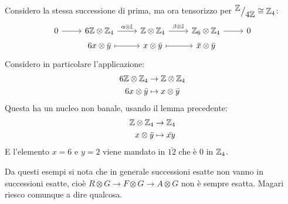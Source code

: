 \begin{example}
  Considero la stessa successione di prima, ma ora tensorizzo per $ {^{\textstyle \mathbb{Z}}\big/_{\textstyle 4 \mathbb{Z}}}  \cong \mathbb{Z}_4 $:
  \[
    \begin{tikzcd}[nodes = {row sep = 3pt}]
      0 \rar{} & 6 \Z \otimes \Z_4 \rar{\alpha \otimes \Id{}} & \Z \otimes \Z_4 \rar{\beta \otimes \Id{}} & \Z_6 \otimes \Z_4 \rar & 0 \\
      {}  & 6x \otimes \bar{y} \rar[mapsto] & x \otimes \bar{y} \rar[mapsto] & \bar{x} \otimes \bar{y}
    \end{tikzcd}
  \]
  Considero in particolare l'applicazione:
  \begin{align*}
    6 \mathbb{Z} \otimes \mathbb{Z}_4 & \to \mathbb{Z} \otimes \mathbb{Z}_4 \\
    6 x \otimes \bar{y} & \mapsto x \otimes \bar{y}
  \end{align*}
  Questa ha un nucleo non banale, usando il lemma
  precedente:
  \begin{align*}
    \mathbb{Z} \otimes \mathbb{Z}_4 & \to \mathbb{Z}_4 \\
     x \otimes \bar{y} & \mapsto \bar{xy}
  \end{align*}
  E l'elemento $ x = 6 $ e $ y = 2 $ viene mandato in $ \bar{12} $ che è $ 0 $ in $ \mathbb{Z}_4 $.

\end{example}

Da questi esempi si nota che in generale successioni esatte non vanno in successioni esatte,
cioè $ R \otimes G \to F \otimes G \to A \otimes G $ non è sempre esatta. Magari riesco comunque a dire qualcosa.


